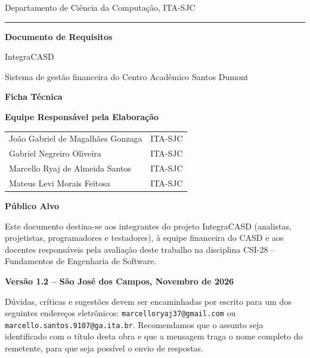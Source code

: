 \documentclass[11pt,a4paper,oneside]{report}
\begin{document}

\begin{titlepage}
  \pagestyle{empty}
  {\large Departamento de Ciência da Computação, ITA-SJC\par}
  \vspace{0.5em}
  {\color{casdamarelo}\rule{\linewidth}{2pt}\par}
  \vspace{2em}
  {\Huge\bfseries Documento de Requisitos\par}
  \vspace{0.5em}
  {\LARGE IntegraCASD\par}
  \vspace{0.3em}
  {\large Sistema de gestão financeira do Centro Acadêmico Santos Dumont\par}

  \vspace{3em}
  {\large\bfseries Ficha Técnica\par}
  \vspace{1em}
  \textbf{Equipe Responsável pela Elaboração}\par
  \begin{tabular}{@{}ll@{}}
    João Gabriel de Magalhães Gonzaga & ITA-SJC \\
    Gabriel Negreiro Oliveira         & ITA-SJC \\
    Marcello Ryaj de Almeida Santos   & ITA-SJC \\
    Mateus Levi Morais Feitosa        & ITA-SJC \\
  \end{tabular}

  \vspace{1.5em}
  \textbf{Público Alvo}\par
  Este documento destina-se aos integrantes do projeto IntegraCASD (analistas, projetistas,
  programadores e testadores), à equipe financeira do CASD e aos docentes responsáveis pela
  avaliação deste trabalho na disciplina CSI-28 -- Fundamentos de Engenharia de Software.

  \vfill
  \begin{center}
    {\large\bfseries Versão 1.2 -- São José dos Campos, Novembro de 2026\par}
  \end{center}
  \vspace{1em}
  Dúvidas, críticas e sugestões devem ser encaminhadas por escrito para um dos seguintes endereços
  eletrônicos: \texttt{marcelloryaj37@gmail.com} ou \texttt{marcello.santos.9107@ga.ita.br}.
  Recomendamos que o assunto seja identificado com o título desta obra e que a mensagem traga o
  nome completo do remetente, para que seja possível o envio de respostas.
\end{titlepage}
\end{document}

